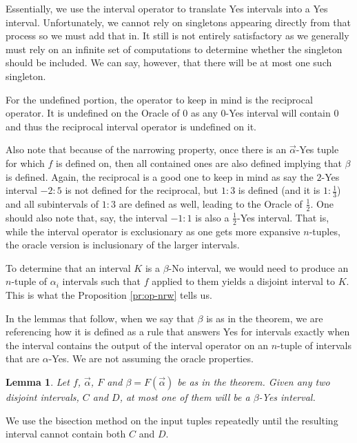 \documentclass[12pt]{article}
\newtheorem{lemma}{Lemma}
\theoremstyle{remark}
\begin{document}
Essentially, we use the interval operator to translate Yes intervals into a Yes interval. Unfortunately, we cannot rely on singletons appearing directly from that process so we must add that in. It still is not entirely satisfactory as we generally must rely on an infinite set of computations to determine whether the singleton should be included. We can say, however, that there will be at most one such singleton. 

For the undefined portion, the operator to keep in mind is the reciprocal operator. It is undefined on the Oracle of 0 as any 0-Yes interval will contain 0 and thus the reciprocal interval operator is undefined on it. 

Also note that because of the narrowing property, once there is an $\vec{\alpha}$-Yes tuple for which $f$ is defined on, then all contained ones are also defined implying that $\beta$ is defined. Again, the reciprocal is a good one to keep in mind as say the $2$-Yes interval $-2:5$ is not defined for the reciprocal, but $1:3$ is defined (and it is $1:\frac{1}{3}$) and all subintervals of $1:3$ are defined as well, leading to the Oracle of $\frac{1}{2}$. One should also note that, say, the interval $-1:1$ is also a $\frac{1}{2}$-Yes interval. That is, while the interval operator is exclusionary as one gets more expansive $n$-tuples, the oracle version is inclusionary of the larger intervals. 

To determine that an interval $K$ is a $\beta$-No interval, we would need to produce an $n$-tuple of $\alpha_i$ intervals such that $f$ applied to them yields a disjoint interval to $K$. This is what the Proposition \ref{pr:op-nrw} tells us.  

In the lemmas that follow, when we say that $\beta$ is as in the theorem, we are referencing how it is defined as a rule that answers Yes for intervals exactly when the interval contains the output of the interval operator on an $n$-tuple of intervals that are $\alpha$-Yes. We are not assuming the oracle properties. 

\begin{lemma}
Let $f$, $\vec{\alpha}$, $F$ and $\beta = F(\vec{\alpha})$ be as in the theorem. Given any two disjoint intervals, $C$ and $D$, at most one of them will be a $\beta$-Yes interval.
\end{lemma}

We use the bisection method on the input tuples repeatedly until the resulting interval cannot contain both $C$ and $D$. 
\end{document}
